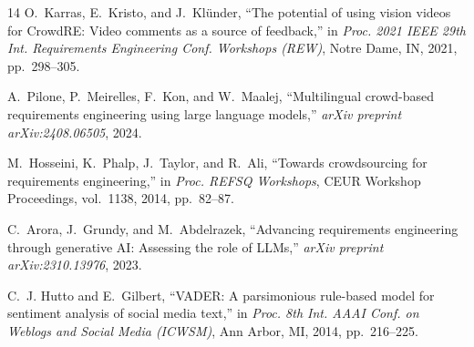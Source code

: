 \documentclass[conference]{IEEEtran}
\begin{document}
\begin{thebibliography}{14}
O.~Karras, E.~Kristo, and J.~Kl\"{u}nder,
``The potential of using vision videos for CrowdRE: Video comments as a source of feedback,''
in \textit{Proc. 2021 IEEE 29th Int. Requirements Engineering Conf. Workshops (REW)},
Notre Dame, IN, 2021, pp.~298--305.

A.~Pilone, P.~Meirelles, F.~Kon, and W.~Maalej,
``Multilingual crowd-based requirements engineering using large language models,''
\textit{arXiv preprint arXiv:2408.06505}, 2024.

M.~Hosseini, K.~Phalp, J.~Taylor, and R.~Ali,
``Towards crowdsourcing for requirements engineering,''
in \textit{Proc. REFSQ Workshops},
CEUR Workshop Proceedings, vol.~1138, 2014, pp.~82--87.

C.~Arora, J.~Grundy, and M.~Abdelrazek,
``Advancing requirements engineering through generative AI: Assessing the role of LLMs,''
\textit{arXiv preprint arXiv:2310.13976}, 2023.

C.~J. Hutto and E.~Gilbert,
``VADER: A parsimonious rule-based model for sentiment analysis of social media text,''
in \textit{Proc. 8th Int. AAAI Conf. on Weblogs and Social Media (ICWSM)},
Ann Arbor, MI, 2014, pp.~216--225.

\end{thebibliography}
\end{document}
